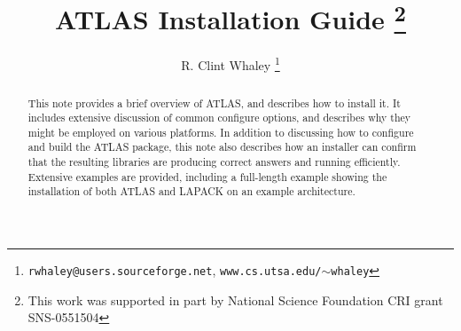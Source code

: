 \documentclass[11pt]{article}
\begin{document}
\headheight=25.3pt

\begin{titlepage}
\title{ATLAS Installation Guide
   \footnote{This work was supported in part by National Science
             Foundation CRI grant SNS-0551504}}
\vspace{.4in}
\author
{
 R. Clint Whaley \thanks { {\tt rwhaley@users.sourceforge.net}, 
 {\tt www.cs.utsa.edu/$\sim$whaley}}
}
\end{titlepage}
\maketitle


\begin{abstract}
This note provides a brief overview of ATLAS, and describes how to install
it.  It includes extensive discussion of common configure options, and
describes why they might be employed on various platforms.  In addition
to discussing how to configure and build the ATLAS package,
this note also describes how an installer can confirm that the resulting
libraries are producing correct answers and running efficiently.
Extensive examples are provided, including a full-length example showing
the installation of both ATLAS and LAPACK on an example architecture.

\end{abstract}

\newpage
\headheight=12.5pt
\begin{small}
\tableofcontents
\end{small}

\newpage
\setcounter{page}{1}
\end{document}
